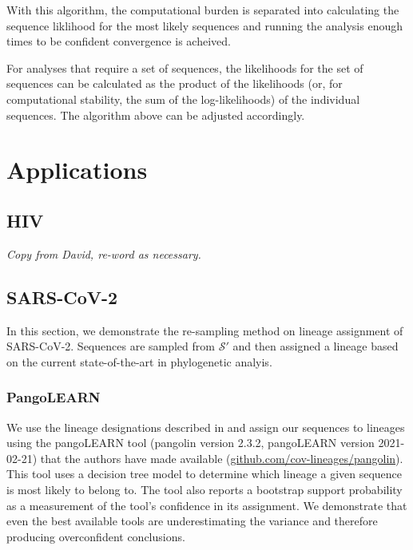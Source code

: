 \documentclass[
]{article}
\newcommand{\nps}{\mathcal{S}} %
\begin{document}
With this algorithm, the computational burden is separated into
calculating the sequence liklihood for the most likely sequences and
running the analysis enough times to be confident convergence is
acheived.

For analyses that require a set of sequences, the likelihoods for the
set of sequences can be calculated as the product of the likelihoods
(or, for computational stability, the sum of the log-likelihoods) of the
individual sequences. The algorithm above can be adjusted accordingly.

\hypertarget{applications}{%
\section{Applications}\label{applications}}

\hypertarget{hiv}{%
\subsection{HIV}\label{hiv}}

\emph{Copy from David, re-word as necessary.}

\hypertarget{sars-cov-2}{%
\subsection{SARS-CoV-2}\label{sars-cov-2}}

In this section, we demonstrate the re-sampling method on lineage
assignment of SARS-CoV-2. Sequences are sampled from \(\nps'\) and then
assigned a lineage based on the current state-of-the-art in phylogenetic
analyis.

\hypertarget{pangolearn}{%
\subsubsection{PangoLEARN}\label{pangolearn}}

We use the lineage designations described in
\citet{rambautDynamicNomenclatureProposal2020} and assign our sequences
to lineages using the pangoLEARN tool (pangolin version 2.3.2,
pangoLEARN version 2021-02-21) that the authors have made available
(\url{github.com/cov-lineages/pangolin}). This tool uses a decision tree
model to determine which lineage a given sequence is most likely to
belong to. The tool also reports a bootstrap support probability as a
measurement of the tool's confidence in its assignment. We demonstrate
that even the best available tools are underestimating the variance and
therefore producing overconfident conclusions.
\end{document}
